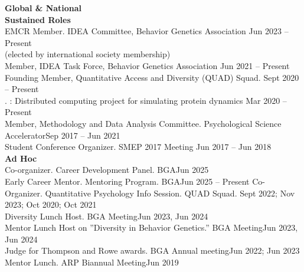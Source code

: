 {\large \textbf{Global \& National}}\\
\textrm{\textbf{Sustained Roles}}\\
EMCR Member. IDEA Committee, Behavior Genetics Association \hfill{Jun 2023 – Present}\\ %
\hspace*{25pt}(elected by international society membership)\\ 
Member, IDEA Task Force, Behavior Genetics Association \hfill{Jun 2021 – Present}\\
Founding Member, Quantitative Access and Diversity (QUAD) Squad. \hfill{Sept 2020 – Present}\\%
. : Distributed computing project for simulating protein dynamics \hfill{Mar 2020 – Present}\\
Member, Methodology and Data Analysis Committee. Psychological Science Accelerator\hfill{Sep 2017 – Jun 2021}\\
Student Conference Organizer. SMEP 2017 Meeting \hfill{Jun 2017 – Jun 2018}\medskip\\
\textrm{\textbf{Ad Hoc}}\\
Co-organizer. Career Development Panel. BGA\hfill{Jun 2025}\\
Early Career Mentor. Mentoring Program. BGA\hfill{Jun 2025 – Present}\newline
Co-Organizer. Quantitative Psychology Info Session. QUAD Squad. \hfill{Sept 2022; Nov 2023;}\newline
\hspace*{0pt}\hfill{Oct 2020; Oct 2021}\\
Diversity Lunch Host. BGA Meeting\hfill{Jun 2023, Jun 2024}\\%
Mentor Lunch Host on ''Diversity in Behavior Genetics.'' BGA Meeting\hfill{Jun 2023, Jun 2024}\\
Judge for Thompson and Rowe awards. BGA Annual meeting\hfill{Jun 2022; Jun 2023}\\
Mentor Lunch. ARP Biannual Meeting\hfill{Jun 2019}\\

